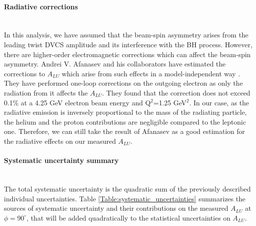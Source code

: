 \paragraph{Radiative corrections} ~\\
In this analysis, we have assumed that the beam-spin asymmetry arises from the 
leading twist DVCS amplitude and its interference with the BH process.  
However, there are higher-order electromagnetic corrections which can affect 
the beam-spin asymmetry. Andrei V. Afanasev and his collaborators have 
estimated the corrections to $A_{LU}$ which arise from such effects in a 
model-independent way \cite{Afanasev}. They have performed one-loop corrections 
on the outgoing electron as only the radiation from it affects the $A_{LU}$.  
They found that the correction does not exceed 0.1$\%$ at a 4.25 GeV electron 
beam energy and Q$^{2}$=1.25 GeV$^{2}$. In our case, as the radiative emission 
is inversely proportional to the mass of the radiating particle, the helium and 
the proton contributions are negligible compared to the leptonic one.  
Therefore, we can still take the result of Afanasev as a good estimation for 
the radiative  effects on our measured $A_{LU}$.



\paragraph{Systematic uncertainty summary} ~\\
The total systematic uncertainty is the quadratic sum of the previously 
described individual uncertainties. Table \ref{Table:systematic_uncertainties} 
summarizes the sources of systematic uncertainty and their contributions on the 
measured $A_{LU}$ at $\phi = 90^{\circ}$, that will be added quadratically to 
the statistical uncertainties on $A_{LU}$. 

